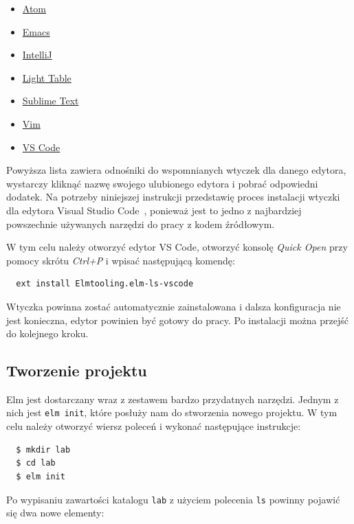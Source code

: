 \documentclass[twoside,a4paper]{report}
\begin{document}
\begin{itemize}[noitemsep,topsep=0pt]
    \item{\href{https://atom.io/packages/language-elm}{Atom}}
    \item{\href{https://github.com/jcollard/elm-mode}{Emacs}}
    \item{\href{https://github.com/klazuka/intellij-elm}{IntelliJ}}
    \item{\href{https://github.com/rundis/elm-light}{Light Table}}
    \item{\href{https://github.com/evancz/elm-syntax-highlighting/}{Sublime Text}}
    \item{\href{https://github.com/elm-tooling/elm-vim}{Vim}}
    \item{\href{https://github.com/elm-tooling/elm-language-client-vscode}{VS Code}}
\end{itemize}

Powyższa lista zawiera odnośniki do wspomnianych wtyczek dla danego edytora, wystarczy kliknąć nazwę swojego ulubionego edytora i pobrać odpowiedni dodatek.
Na potrzeby niniejszej instrukcji przedstawię proces instalacji wtyczki dla edytora Visual Studio Code~\cite{vscode}, ponieważ jest to jedno z najbardziej powszechnie używanych narzędzi do pracy z kodem źródłowym.

W tym celu należy otworzyć edytor VS Code, otworzyć konsolę \textit{Quick Open} przy pomocy skrótu \textit{Ctrl+P} i wpisać następującą komendę:
\begin{lstlisting}
  ext install Elmtooling.elm-ls-vscode
\end{lstlisting}
Wtyczka powinna zostać automatycznie zainstalowana i dalsza konfiguracja nie jest konieczna, edytor powinien być gotowy do pracy.
Po instalacji można przejść do kolejnego kroku.

\subsection*{Tworzenie projektu}
Elm jest dostarczany wraz z zestawem bardzo przydatnych narzędzi.
Jednym z nich jest \texttt{elm init}, które posłuży nam do stworzenia nowego projektu.
W tym celu należy otworzyć wiersz poleceń i wykonać następujące instrukcje:

\begin{lstlisting}
  $ mkdir lab
  $ cd lab
  $ elm init
\end{lstlisting}

Po wypisaniu zawartości katalogu \texttt{lab} z użyciem polecenia \texttt{ls} powinny pojawić się dwa nowe elementy:
\end{document}
